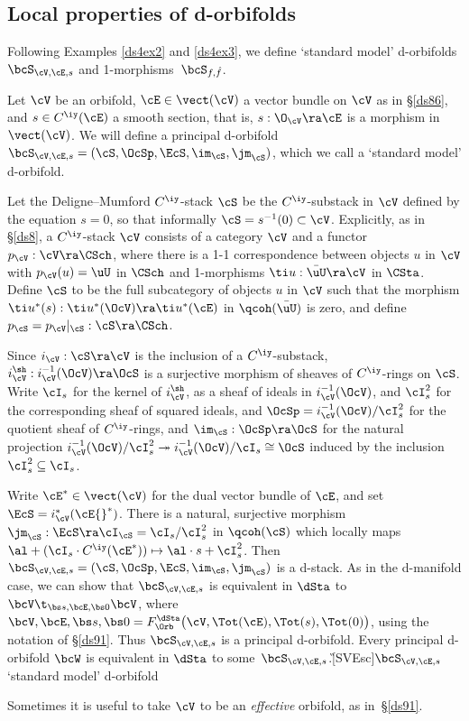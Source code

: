 \documentclass{article}
\begin{document}
\subsection{Local properties of d-orbifolds}
\label{ds112}

Following Examples \ref{ds4ex2} and \ref{ds4ex3}, we define
`standard model' d-orbifolds $\bcS_{\cV,\cE,s}$ and
1-morphisms~$\bcS_{\smash{f,\hat f}}$.

\begin{ex} Let $\cV$ be an orbifold, $\cE\in\vect(\cV)$ a vector
bundle on $\cV$ as in \S\ref{ds86}, and $s\in C^\iy(\cE)$ a smooth
section, that is, $s:\O_\cV\ra\cE$ is a morphism in $\vect(\cV)$. We
will define a principal d-orbifold $\bcS_{\cV,\cE,s}=(\cS,\OcSp,
\EcS,\im_\cS,\jm_\cS)$, which we call a `standard model' d-orbifold.

Let the Deligne--Mumford $C^\iy$-stack $\cS$ be the $C^\iy$-substack
in $\cV$ defined by the equation $s=0$, so that informally
$\cS=s^{-1}(0)\subset\cV$. Explicitly, as in \S\ref{ds8}, a
$C^\iy$-stack $\cV$ consists of a category $\cV$ and a functor
$p_\cV:\cV\ra\CSch$, where there is a 1-1 correspondence between
objects $u$ in $\cV$ with $p_\cV(u)=\uU$ in $\CSch$ and 1-morphisms
$\ti u:\bar\uU\ra\cV$ in $\CSta$. Define $\cS$ to be the full
subcategory of objects $u$ in $\cV$ such that the morphism $\ti
u{}^*(s):\ti u{}^*(\OcV)\ra\ti u{}^*(\cE)$ in $\qcoh(\bar\uU)$ is
zero, and define~$p_\cS=p_\cV\vert_\cS:\cS\ra\CSch$.

Since $i_\cV:\cS\ra\cV$ is the inclusion of a $C^\iy$-substack,
$i_\cV^\sh:i_\cV^{-1}(\OcV)\ra\OcS$ is a surjective morphism of
sheaves of $C^\iy$-rings on $\cS$. Write $\cI_s$ for the kernel of
$i_\cV^\sh$, as a sheaf of ideals in $i_\cV^{-1}(\OcV)$, and
$\cI_s^2$ for the corresponding sheaf of squared ideals, and
$\OcSp=i_\cV^{-1}(\OcV)/\cI_s^2$ for the quotient sheaf of
$C^\iy$-rings, and $\im_\cS:\OcSp\ra\OcS$ for the natural projection
$i_\cV^{-1}(\OcV)/\cI_s^2\twoheadrightarrow
i_\cV^{-1}(\OcV)/\cI_s\cong\OcS$ induced by the
inclusion~$\cI_s^2\subseteq \cI_s$.

Write $\cE^*\in\vect(\cV)$ for the dual vector bundle of $\cE$, and
set $\EcS=i_\cV^*(\cE{}^*)$. There is a natural, surjective morphism
$\jm_\cS:\EcS\ra\cI_\cS=\cI_s/\cI_s^2$ in $\qcoh(\cS)$ which locally
maps $\al+(\cI_s\cdot C^\iy(\cE^*))\mapsto \al\cdot s+\cI_s^2$. Then
$\bcS_{\cV,\cE,s}=(\cS,\OcSp,\EcS,\im_\cS,\jm_\cS)$ is a d-stack. As
in the d-manifold case, we can show that $\bcS_{\cV,\cE,s}$ is
equivalent in $\dSta$ to $\bcV\t_{\bs s,\bcE,\bs 0}\bcV$, where
$\bcV,\bcE,\bs s,\bs 0=F_\Orb^\dSta\bigl(\cV,\Tot(\cE),
\Tot(s),\Tot(0)\bigr)$, using the notation of \S\ref{ds91}. Thus
$\bcS_{\cV,\cE,s}$ is a principal d-orbifold. Every principal
d-orbifold $\bcW$ is equivalent in $\dSta$ to
some~$\bcS_{\cV,\cE,s}$.\G[SVEsc]{$\bcS_{\cV,\cE,s}$}{`standard
model' d-orbifold}

Sometimes it is useful to take $\cV$ to be an {\it effective\/}
orbifold, as in~\S\ref{ds91}.
\label{ds11ex1}
\end{ex}
\end{document}
